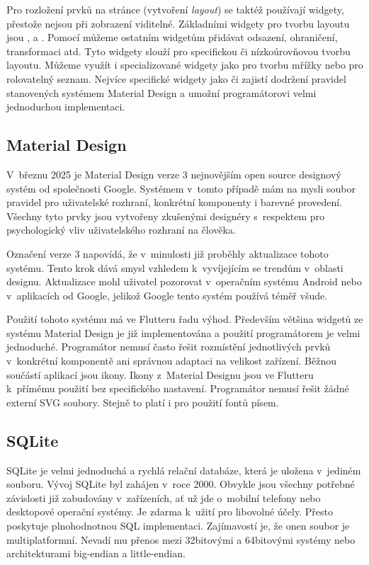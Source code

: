 \documentclass[
  biblatex,
  figures=true,
  tables=false,
  glossaries,
  index
]{kidiplom}
\begin{document}
Pro rozložení prvků na stránce (vytvoření \textit{layout}) se taktéž používají widgety, přestože nejsou při zobrazení viditelné. Základními widgety pro tvorbu layoutu jsou ,  a . Pomocí  můžeme ostatním widgetům přidávat odsazení, ohraničení, transformaci atd. Tyto widgety slouží pro specifickou či nízkoúrovňovou tvorbu layoutu. Můžeme využít i specializované widgety jako  pro tvorbu mřížky nebo  pro rolovatelný seznam. Nejvíce specifické widgety jako  či  zajistí dodržení pravidel stanovených systémem Material Design a umožní programátorovi velmi jednoduchou implementaci.

\subsection{Material Design} \label{sec:material-design}
V~březnu 2025 je Material Design verze 3 \cite{m3} nejnovějším open source designový systém od společnosti Google. Systémem v~tomto případě mám na mysli soubor pravidel pro uživatelské rozhraní, konkrétní komponenty i barevné provedení. Všechny tyto prvky jsou vytvořeny zkušenými designéry s~respektem pro psychologický vliv uživatelského rozhraní na člověka.

Označení verze 3 napovídá, že v~minulosti již proběhly aktualizace tohoto systému. Tento krok dává smysl vzhledem k~vyvíjejícím se trendům v~oblasti designu. Aktualizace mohl uživatel pozorovat v~operačním systému Android nebo v~aplikacích od Google, jelikož Google tento systém používá téměř všude.

Použití tohoto systému má ve Flutteru řadu výhod. Především většina widgetů ze systému Material Design je již implementována a použití programátorem je velmi jednoduché. Programátor nemusí často řešit rozmístění jednotlivých prvků v~konkrétní komponentě ani správnou adaptaci na velikost zařízení. Běžnou součástí aplikací jsou ikony. Ikony z~Material Designu jsou ve Flutteru k~přímému použití bez specifického nastavení. Programátor nemusí řešit žádné externí SVG soubory. Stejně to platí i pro použití fontů písem.

\subsection{SQLite}
SQLite \cite{sqlite} je velmi jednoduchá a rychlá relační databáze, která je uložena v~jediném souboru. Vývoj SQLite byl zahájen v~roce 2000. Obvykle jsou všechny potřebné závislosti již zabudovány v~zařízeních, ať už jde o~mobilní telefony nebo desktopové operační systémy. Je zdarma k~užití pro libovolné účely. Přesto poskytuje plnohodnotnou SQL implementaci. Zajímavostí je, že onen soubor je multiplatformní. Nevadí mu přenos mezi 32bitovými a 64bitovými systémy nebo architekturami big-endian a little-endian.
\end{document}
